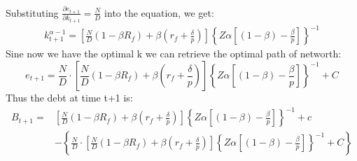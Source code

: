 \documentclass[12pt]{article}
\begin{document}
Substituting \(\frac{\partial e_{t+1}}{\partial k_{t+1}} = \frac{N}{D}\) into the equation, we get:
\begin{align*}
    k^{\alpha-1}_{t+1} = \left[\frac{N}{D}\left(1-\beta R_f\right) + \beta \left(r_f+\frac{\delta}{p}\right)\right]\left\{Z\alpha\left[\left(1-\beta\right)-\frac{\beta}{p}\right]\right\}^{-1}
\end{align*}
Sine now we have the optimal k we can retrieve the optimal path of networth:
\[e_{t+1} = \frac{N}{D} \cdot \left[\frac{N}{D}\left(1-\beta R_f\right) + \beta
\left(r_f+\frac{\delta}{p}\right)\right]\left\{Z\alpha\left[\left(1-\beta\right)-\frac{\beta}{p}\right]\right\}^{-1} +
C\]
Thus the debt at time t+1 is:
\begin{align}
    B_{t+1} = & \left[\frac{N}{D}\left(1-\beta R_f\right) + \beta\left(r_f+\frac{\delta}{p}\right)\right]\left\{Z\alpha\left[\left(1-\beta\right)-\frac{\beta}{p}\right]\right\}^{-1} + c \nonumber \\
    & - \left\{\frac{N}{D} \cdot \left[\frac{N}{D}\left(1-\beta R_f\right) + \beta\left(r_f+\frac{\delta}{p}\right)\right]\left\{Z\alpha\left[\left(1-\beta\right)-\frac{\beta}{p}\right]\right\}^{-1} + C\right\}
\end{align}

\medskip

\end{document}
